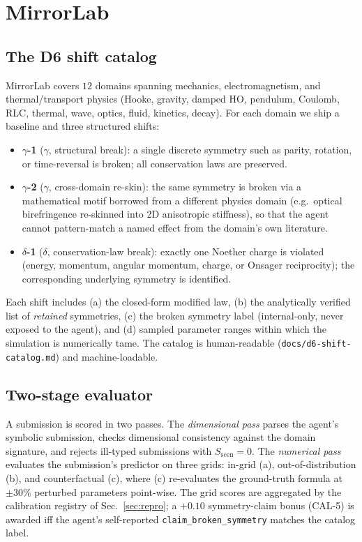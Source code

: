 \documentclass{article}
\begin{document}
\section{MirrorLab}
\label{sec:bench}

\subsection{The D6 shift catalog}
MirrorLab covers $12$ domains spanning mechanics, electromagnetism, and
thermal/transport physics (Hooke, gravity, damped HO, pendulum,
Coulomb, RLC, thermal, wave, optics, fluid, kinetics, decay). For each
domain we ship a baseline and three structured shifts:

\begin{itemize}\itemsep0pt
\item \textbf{$\gamma$-1} ($\gamma$, structural break): a single discrete
      symmetry such as parity, rotation, or time-reversal is broken;
      all conservation laws are preserved.
\item \textbf{$\gamma$-2} ($\gamma$, cross-domain re-skin): the same
      symmetry is broken via a mathematical motif borrowed from a
      different physics domain (e.g.\ optical birefringence re-skinned
      into 2D anisotropic stiffness), so that the agent cannot
      pattern-match a named effect from the domain's own literature.
\item \textbf{$\delta$-1} ($\delta$, conservation-law break): exactly one
      Noether charge is violated (energy, momentum, angular momentum,
      charge, or Onsager reciprocity); the corresponding underlying
      symmetry is identified.
\end{itemize}

Each shift includes (a) the closed-form modified law, (b) the
analytically verified list of \emph{retained} symmetries, (c) the
broken symmetry label (internal-only, never exposed to the agent), and
(d) sampled parameter ranges within which the simulation is numerically
tame. The catalog is human-readable
(\texttt{docs/d6-shift-catalog.md}) and machine-loadable.

\subsection{Two-stage evaluator}
A submission is scored in two passes. The \emph{dimensional pass}
parses the agent's symbolic submission, checks dimensional consistency
against the domain signature, and rejects ill-typed submissions with
$S_{\mathrm{scen}}=0$. The \emph{numerical pass} evaluates the
submission's predictor on three grids: in-grid (a), out-of-distribution
(b), and counterfactual (c), where (c) re-evaluates the ground-truth
formula at $\pm 30\%$ perturbed parameters point-wise. The grid scores
are aggregated by the calibration registry of
Sec.~\ref{sec:repro}; a $+0.10$ symmetry-claim bonus (CAL-5) is
awarded iff the agent's self-reported
\texttt{claim\_broken\_symmetry} matches the catalog label.
\end{document}
